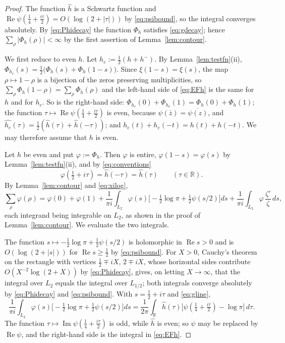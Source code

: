 \documentclass[11pt]{amsart}
\theoremstyle{remark}
\numberwithin{equation}{section}
\newcommand{\R}{\mathbb R}
\newcommand{\Rel}{\operatorname{Re}}
\newcommand{\Iml}{\operatorname{Im}}
\begin{document}
\begin{proof}
The function $\hat h$ is a Schwartz function and
$\Rel\psi(\tfrac14+\tfrac{i\tau}2)=O(\log(2+|\tau|))$ by
\eqref{eq:psibound}, so the integral converges absolutely.  By
\eqref{eq:Phidecay} the function $\Phi_h$ satisfies \eqref{eq:gdecay}; hence
$\sum_\rho|\Phi_h(\rho)|<\infty$ by the first assertion of
Lemma~\ref{lem:contour}.

We first reduce to even $h$.  Let $h_e:=\tfrac12(h+h^-)$.  By
Lemma~\ref{lem:testfn}(ii),
$\Phi_{h_e}(s)=\tfrac12\bigl(\Phi_h(s)+\Phi_h(1-s)\bigr)$.  Since
$\xi(1-s)=\xi(s)$, the map $\rho\mapsto1-\rho$ is a bijection of the zeros
preserving multiplicities, so
$\sum_\rho\Phi_h(1-\rho)=\sum_\rho\Phi_h(\rho)$ and the left-hand side of
\eqref{eq:EFh} is the same for $h$ and for $h_e$.  So is the right-hand
side: $\Phi_{h_e}(0)+\Phi_{h_e}(1)=\Phi_h(0)+\Phi_h(1)$; the function
$\tau\mapsto\Rel\psi(\tfrac14+\tfrac{i\tau}2)$ is even, because
$\psi(\bar z)=\overline{\psi(z)}$, and
$\widehat{h_e}(\tau)=\tfrac12(\hat h(\tau)+\hat h(-\tau))$; and
$h_e(t)+h_e(-t)=h(t)+h(-t)$.  We may therefore assume that $h$ is even.

Let $h$ be even and put $\varphi:=\Phi_h$.  Then $\varphi$ is entire, $\varphi(1-s)=\varphi(s)$ by
Lemma~\ref{lem:testfn}(ii), and by \eqref{eq:conventions}
\begin{equation}
\label{eq:gline}
  \varphi(\tfrac12+i\tau)=\hat h(-\tau)=\hat h(\tau)\qquad(\tau\in\R).
\end{equation}
By Lemma~\ref{lem:contour} and \eqref{eq:xilog},
\begin{equation}
\label{eq:threeterms}
  \sum_\rho \varphi(\rho)=\varphi(0)+\varphi(1)
  +\frac1{\pi i}\int_{L_2}\varphi(s)\bigl[-\tfrac12\log\pi+\tfrac12\psi(s/2)\bigr]ds
  +\frac1{\pi i}\int_{L_2}\varphi \,\frac{\zeta'}{\zeta}\,ds ,
\end{equation}
each integrand being integrable on $L_2$, as shown in the proof of
Lemma~\ref{lem:contour}.  We evaluate the two integrals.

The function $s\mapsto-\tfrac12\log\pi+\tfrac12\psi(s/2)$ is holomorphic in
$\Rel s>0$ and is $O(\log(2+|s|))$ for $\Rel s\ge\tfrac12$ by
\eqref{eq:psibound}.  For $X>0$, Cauchy's theorem on the rectangle with
vertices $\tfrac12\mp iX$, $2\mp iX$, whose horizontal sides contribute
$O(X^{-2}\log(2+X))$ by \eqref{eq:Phidecay}, gives, on letting
$X\to\infty$, that the integral over $L_2$ equals the integral over
$L_{1/2}$; both integrals converge absolutely by \eqref{eq:Phidecay} and
\eqref{eq:psibound}.  With $s=\tfrac12+i\tau$ and
\eqref{eq:gline},
\[
  \frac1{\pi i}\int_{L_2}\varphi(s)\bigl[-\tfrac12\log\pi+\tfrac12\psi(s/2)\bigr]ds
  =\frac1{2\pi}\int_\R\hat h(\tau)
   \bigl[\psi(\tfrac14+\tfrac{i\tau}2)-\log\pi\bigr]\,d\tau .
\]
The function $\tau\mapsto\Iml\psi(\tfrac14+\tfrac{i\tau}2)$ is odd, while
$\hat h$ is even; so $\psi$ may be replaced by $\Rel\psi$, and the right-hand
side is the integral in \eqref{eq:EFh}.


\end{proof}
\end{document}
